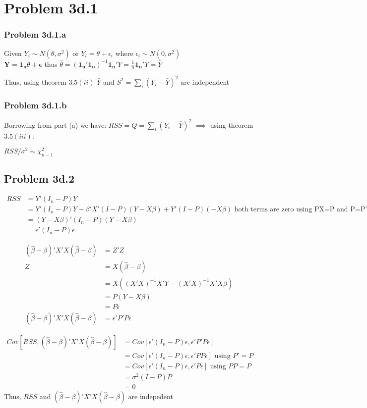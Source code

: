 \documentclass[a4paper]{article}
\begin{document}
\section*{Problem 3d.1}
\subsubsection*{Problem 3d.1.a}
Given $Y_i \sim N(\theta, \sigma^2)$ or $Y_i = \theta + \epsilon_i$ where $\epsilon_i \sim N(0, \sigma^2)$ \\
$\mathbf{Y} = \mathbf{1_n}\theta + \mathbf{\epsilon}$ thus $\hat{\theta} = (\mathbf{1_n}'\mathbf{1_n})^{-1}\mathbf{1_n'}Y = \frac{1}{n}\mathbf{1_n'}Y  = \bar{Y}$

Thus,  using theorem  $3.5(ii)$ $\bar{Y}$ and $S^2=\sum_i(Y_i-\bar{Y})^2$ are independent

\subsubsection*{Problem 3d.1.b}
Borrowing from part (a)  we have: $RSS=Q=\sum_i(Y_i-\bar{Y})^2$ $\implies$ using  theorem $3.5(iii)$:

$RSS/\sigma^2 \sim \chi^2_{n-1}$

\subsection*{Problem 3d.2}
\begin{align*}
RSS &= Y'(I_n-P)Y\\
&= Y'(I_n-P)Y-\beta'X'(I-P)(Y-X\beta)+Y'(I-P)(-X\beta) \text{ both terms are zero using PX=P and P=P'} \\
&= (Y-X\beta)'(I_n-P)(Y-X\beta)\\
&= \epsilon'(I_n-P)\epsilon
\end{align*}

\begin{align*}
(\hat{\beta}-\beta)'X'X(\hat{\beta}-\beta) &= Z'Z\\
Z &= X(\hat{\beta}-\beta)\\
&= X((X'X)^{-1}X'Y-(X'X)^{-1}X'X\beta)\\
&= P(Y-X\beta)\\
&= P\epsilon\\
(\hat{\beta}-\beta)'X'X(\hat{\beta}-\beta) &= \epsilon'P'P\epsilon
\end{align*}

\begin{align*}
Cov[RSS, (\hat{\beta}-\beta)'X'X(\hat{\beta}-\beta)] &= Cov[\epsilon'(I_n-P)\epsilon, \epsilon'P'P\epsilon]\\
&=  Cov[\epsilon'(I_n-P)\epsilon, \epsilon'PP\epsilon] \text{ using } P'=P\\
&=  Cov[\epsilon'(I_n-P)\epsilon, \epsilon' P\epsilon] \text{ using } PP = P\\
&= \sigma^2(I-P)P \\
&= 0
\end{align*}
Thus, $RSS$ and $(\hat{\beta}-\beta)'X'X(\hat{\beta}-\beta)$ are indepedent
\end{document}

